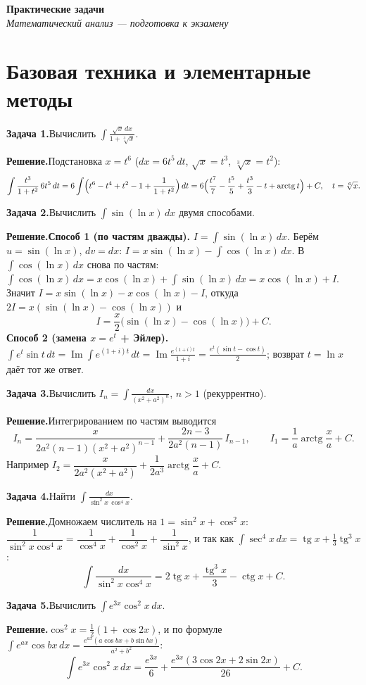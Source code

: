 \documentclass[10pt,a4paper]{article}
\newcommand{\coursename}{Математический анализ — подготовка к экзамену}
\newcommand{\doctitle}{Практические задачи}
\DeclareMathOperator{\tg}{tg}
\DeclareMathOperator{\ctg}{ctg}
\DeclareMathOperator{\arctg}{arctg}
\newcommand{\dx}{\,dx}
\newcommand{\dt}{\,dt}
\renewcommand{\Im}{\operatorname{Im}}
\theoremstyle{definition}
\theoremstyle{plain}
\newcommand{\writespace}{\vspace{7.5mm}}
\newcommand{\task}[2]{%
  \par\writespace\noindent
  \textbf{\textcolor{accent}{Задача #1.}}\enspace #2\par\smallskip}
\newcommand{\sol}{\par\noindent\textbf{Решение.}\enspace}
\begin{document}
\begin{center}
  {\LARGE\bfseries \doctitle}\\[3pt]
  {\large\itshape \coursename}
\end{center}
\vspace{4pt}

\section{Базовая техника и элементарные методы}

\task{1}{Вычислить $\displaystyle\int\frac{\sqrt{x}\dx}{1+\sqrt[3]{x}}$.}
\sol Подстановка $x=t^6$ ($dx=6t^5\dt$, $\sqrt x=t^3$, $\sqrt[3]{x}=t^2$):
\[
  \int\frac{t^3}{1+t^2}\,6t^5\dt=6\int\Bigl(t^6-t^4+t^2-1+\frac1{1+t^2}\Bigr)\dt
  =6\Bigl(\frac{t^7}{7}-\frac{t^5}{5}+\frac{t^3}{3}-t+\arctg t\Bigr)+C,\quad t=\sqrt[6]{x}.
\]

\task{2}{Вычислить $\displaystyle\int\sin(\ln x)\dx$ двумя способами.}
\sol \textbf{Способ 1 (по частям дважды).} $I=\int\sin(\ln x)\dx$. Берём $u=\sin(\ln x)$, $dv=dx$:
$I=x\sin(\ln x)-\int\cos(\ln x)\dx$. В $\int\cos(\ln x)\dx$ снова по частям:
$\int\cos(\ln x)\dx=x\cos(\ln x)+\int\sin(\ln x)\dx=x\cos(\ln x)+I$. Значит
$I=x\sin(\ln x)-x\cos(\ln x)-I$, откуда $2I=x(\sin(\ln x)-\cos(\ln x))$ и
\[
  I=\frac x2\bigl(\sin(\ln x)-\cos(\ln x)\bigr)+C.
\]
\textbf{Способ 2 (замена $x=e^t$ + Эйлер).} $\int e^t\sin t\dt=\Im\int e^{(1+i)t}\dt
=\Im\frac{e^{(1+i)t}}{1+i}=\frac{e^t(\sin t-\cos t)}{2}$; возврат $t=\ln x$ даёт тот же ответ.

\task{3}{Вычислить $\displaystyle I_n=\int\frac{dx}{(x^2+a^2)^n}$, $n>1$ (рекуррентно).}
\sol Интегрированием по частям выводится
\[
  I_n=\frac{x}{2a^2(n-1)(x^2+a^2)^{n-1}}+\frac{2n-3}{2a^2(n-1)}\,I_{n-1},
  \qquad I_1=\frac1a\arctg\frac xa+C.
\]
Например $I_2=\dfrac{x}{2a^2(x^2+a^2)}+\dfrac1{2a^3}\arctg\dfrac xa+C$.

\task{4}{Найти $\displaystyle\int\frac{dx}{\sin^2x\,\cos^4x}$.}
\sol Домножаем числитель на $1=\sin^2x+\cos^2x$:
$\dfrac{1}{\sin^2x\cos^4x}=\dfrac1{\cos^4x}+\dfrac1{\cos^2x}+\dfrac1{\sin^2x}$, и так как
$\int\sec^4x\dx=\tg x+\tfrac13\tg^3x$:
\[
  \int\frac{dx}{\sin^2x\cos^4x}=2\tg x+\frac{\tg^3x}{3}-\ctg x+C.
\]

\task{5}{Вычислить $\displaystyle\int e^{3x}\cos^2x\dx$.}
\sol $\cos^2x=\tfrac12(1+\cos2x)$, и по формуле $\int e^{ax}\cos bx\dx=\tfrac{e^{ax}(a\cos bx+b\sin bx)}{a^2+b^2}$:
\[
  \int e^{3x}\cos^2x\dx=\frac{e^{3x}}{6}+\frac{e^{3x}(3\cos2x+2\sin2x)}{26}+C.
\]
\end{document}
